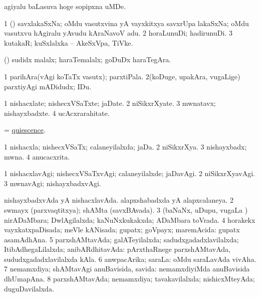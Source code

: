 \bentry
{}
\gl{\nA}
\expl{}
\bmng
agiyalu baLasuva hoge sopipxna uMDe. 
\emng
\eentry

\bentry
{}
\gl{\nA}
\bmng
\bnum
\num{1} (\tashA) savxlakaSxNa; oMdu vasutxvina yA vayxkitxya savxrUpa lakaSxNa; oMdu vasutxvu hAgiralu yAvudu kAraNavoV adu. 
\num{2} horaLunuDi; hadirunuDi. 
\num{3} kutakaR; kuSxlalxka -- AkeSxVpa, TiVke. 
\enum
\emng
\eentry

\bentry
{}
\gl{\nA}
\expl{}
\bmng
(\pArxparx) sudidx malalx; haraTemalalx; goDuDx haraTegAra. 
\emng
\eentry

\bentry
{}
\gl{\nA}
\bmng
\bnum
\num{1} parihAra(vAgi koTaTx vasutx); parxtiPala. 
\num{2}(koDuge, upakAra, \mo vugaLige) parxtiyAgi mADidudx; IDu. 
\enum
\emng
\eentry

\bentry
{}
\gl{\nA}
\bmng
\bnum
\num{1} nishacxlate; nishecxVSaTxte; jaDate. 
\num{2} niSikxrXyate. 
\num{3} mwnatavx; nishayxbadxte. 
\num{4} ucAcxrarahitate. 
\enum
\emng
\eentry

\bentry
{}
\gl{\nA}
\bmng
= \hyperlink{quiescence}{quiescence}. 
\emng
\eentry

\bentry
{}
\gl{\gu}
\bmng
\bnum
\num{1} nishacxla; nishecxVSaTx; calaneyilalxda; jaDa. 
\num{2} niSikxrXya. 
\num{3} nishayxbadx; mwna. 
\num{4} anucacxrita. 
\enum
\emng
\eentry

\bentry
{}
\gl{\kirxvi}
\bmng
\bnum
\num{1} nishacxlavAgi; nishecxVSaTxvAgi; calaneyilalxde; jaDavAgi. 
\num{2} niSikxrXyavAgi. 
\num{3} mwnavAgi; nishayxbadxvAgi. 
\enum
\emng
\eentry

\bentry
{}
\gl{\gu}
\bmng
\bnum
{} 
\banum
{} nishayxbadxvAda yA nishacxlavAda. 
 alapxshabadxda yA alapxcalaneya. 
\eanum
\numie
\num{2} swmayx (parxvaqtitxya); shAMta (savxBAvada). 
\num{3} (baNaNx, uDupu, \mo vugaLa \vi) nirADaMbara; DwlAgilalxda; kaNuNxkukakxda; ADaMbara toVrada. 
\num{4} horakekx vayxkatxpaDisada; meVle kANisada; gupatx; goVpayx; maremAcida:  gupatx asamAdhAna. 
\num{5} parxshAMtavAda; galATeyilalxda; sadudxgadadxlavilalxda; ItibAdhegaLilalxda; anibARdhitavAda:    pArxthaRnege parxshAMtavAda, sududxgadadxlavilalxda kAla. 
\num{6} anwpacArika; saraLa:    oMdu saraLavAda vivAha. 
\num{7} nemamxdiya; shAMtavAgi anuBavisida, savida:    nemamxdiyiMda anuBavisida dhUmapAna. 
\num{8} parxshAMtavAda; nemamxdiya; tavakavilalxda; nishicxMteyAda; duguDavilalxda. 
\enum
\emng

